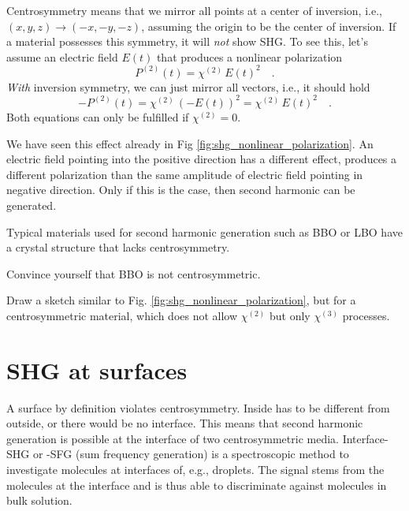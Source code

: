 Centrosymmetry means that we  mirror all points at a center of inversion, i.e., $(x,y,z) \rightarrow (-x, -y, -z)$, assuming the origin to be the center of inversion. If a material possesses  this symmetry, it will \emph{not} show SHG. To see this, let's assume an electric field $E(t)$ that produces a nonlinear polarization
\begin{equation}
P^{(2)}(t) = \chi^{(2)} \, E(t)^2 \quad .
\end{equation}
\emph{With} inversion symmetry, we can just mirror all vectors, i.e., it should hold
\begin{equation}
- P^{(2)}(t) = \chi^{(2)} \, \left( - E(t) \right)^2 = \chi^{(2)} \, E(t)^2  \quad .
\end{equation}
Both equations can only be fulfilled if $ \chi^{(2)} =0$.

We have seen this effect already in Fig \ref{fig:shg_nonlinear_polarization}. An electric field pointing into the positive direction has a different effect, produces a different polarization than the same amplitude of electric field pointing in negative direction. Only if this is the case, then second harmonic can be generated.


Typical materials used for second harmonic generation such as BBO or LBO have a crystal structure that lacks centrosymmetry.

\begin{questions}
\item Convince yourself that BBO is not centrosymmetric.

\item Draw a sketch similar to Fig. \ref{fig:shg_nonlinear_polarization}, but for a centrosymmetric material, which does not allow $\chi^{(2)}$ but only $\chi^{(3)}$  processes.


\end{questions}


\section{SHG at surfaces}

A surface by definition violates centrosymmetry. Inside has to be different from outside, or there would be no interface. This means that second harmonic generation is possible at the interface of two centrosymmetric media. Interface-SHG or -SFG (sum frequency generation) is a spectroscopic method to investigate molecules at interfaces of, e.g., droplets. The signal stems from the molecules at the interface and is thus able to discriminate against molecules in bulk solution.


